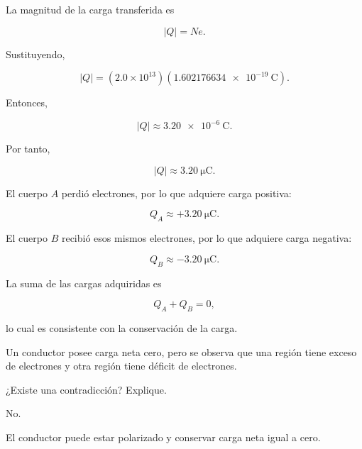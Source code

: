 \begin{explicacion}

La magnitud de la carga transferida es

\[
|Q|=Ne.
\]

Sustituyendo,

\[
|Q|
=
\left(2.0\times10^{13}\right)
\left(\SI{1.602176634e-19}{\coulomb}\right).
\]

Entonces,

\[
|Q|
\approx
\SI{3.20e-6}{\coulomb}.
\]

Por tanto,

\[
|Q|
\approx
\SI{3.20}{\micro\coulomb}.
\]

El cuerpo \(A\) perdió electrones, por lo que adquiere carga positiva:

\[
Q_A\approx+\SI{3.20}{\micro\coulomb}.
\]

El cuerpo \(B\) recibió esos mismos electrones, por lo que adquiere carga
negativa:

\[
Q_B\approx-\SI{3.20}{\micro\coulomb}.
\]

La suma de las cargas adquiridas es

\[
Q_A+Q_B=0,
\]

lo cual es consistente con la conservación de la carga.

\end{explicacion}



\begin{ejercicio}

Un conductor posee carga neta cero, pero se observa que una región tiene
exceso de electrones y otra región tiene déficit de electrones.

¿Existe una contradicción? Explique.

\end{ejercicio}

\begin{respuesta}

No.

El conductor puede estar polarizado y conservar carga neta igual a cero.

\end{respuesta}


